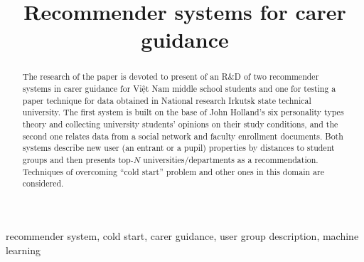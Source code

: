 \documentclass[conference,a4]{IEEEtran}
\begin{document}

\title{Recommender systems for carer guidance}

\author{%
}

\maketitle
\begin{abstract}
  The research of the paper is devoted to present of an R\&D of two recommender systems in carer guidance for Việt Nam middle school students and one for testing a paper \cite{tomsk} technique for data obtained in National research Irkutsk state technical university.  The first system is built on the base of John Holland's six personality types theory and collecting university students' opinions on their study conditions, and the second one relates data from a social network and faculty enrollment documents.  Both systems describe new user (an entrant or a pupil) properties by distances to student groups and then presents top-$N$ universities/departments as a recommendation.  Techniques of overcoming ``cold start'' problem and other ones in this domain are considered.

\end{abstract}

\begin{IEEEkeywords}
recommender system, cold start, carer guidance, user group description, machine learning
\end{IEEEkeywords}
\end{document}
